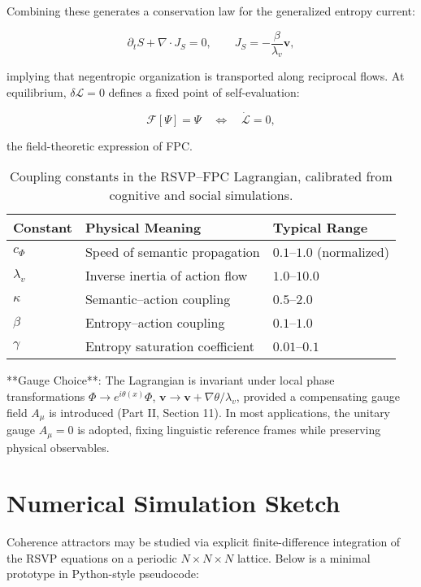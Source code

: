 \documentclass[12pt,a4paper]{article}
\begin{document}
\begin{enumerate}
Combining these generates a conservation law for the generalized entropy current:

\begin{equation}
\partial_t S + \nabla\!\cdot\! J_S = 0,
\qquad
J_S = -\frac{\beta}{\lambda_v} \bm{v},
\end{equation}

implying that negentropic organization is transported along reciprocal flows. At equilibrium, $\delta \mathcal{L} = 0$ defines a fixed point of self-evaluation:

\begin{equation}
\mathcal{F}[\Psi] = \Psi \quad \Leftrightarrow \quad \dot{\mathcal{L}} = 0,
\end{equation}

the field-theoretic expression of FPC.

\begin{table}[h]
\centering
\begin{tabular}{@{}lll@{}}
\toprule
\textbf{Constant} & \textbf{Physical Meaning} & \textbf{Typical Range} \\
\midrule
$c_\Phi$ & Speed of semantic propagation & $0.1$--$1.0$ (normalized) \\
$\lambda_v$ & Inverse inertia of action flow & $1.0$--$10.0$ \\
$\kappa$ & Semantic--action coupling & $0.5$--$2.0$ \\
$\beta$ & Entropy--action coupling & $0.1$--$1.0$ \\
$\gamma$ & Entropy saturation coefficient & $0.01$--$0.1$ \\
\bottomrule
\end{tabular}
\caption{Coupling constants in the RSVP--FPC Lagrangian, calibrated from cognitive and social simulations.}
\end{table}

**Gauge Choice**: The Lagrangian is invariant under local phase transformations $\Phi \to e^{i\theta(x)}\Phi$, $\bm{v} \to \bm{v} + \nabla \theta / \lambda_v$, provided a compensating gauge field $A_\mu$ is introduced (Part II, Section 11). In most applications, the unitary gauge $A_\mu = 0$ is adopted, fixing linguistic reference frames while preserving physical observables.

\section{Numerical Simulation Sketch}

Coherence attractors may be studied via explicit finite-difference integration of the RSVP equations on a periodic $N \times N \times N$ lattice. Below is a minimal prototype in Python-style pseudocode:


\end{enumerate}
\end{document}

